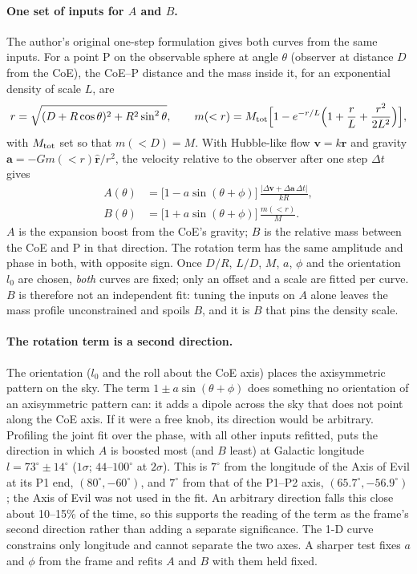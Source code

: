 \documentclass[11pt,a4paper]{article}
\newcommand{\dg}{^\circ}
\begin{document}
\paragraph{One set of inputs for $A$ and $B$.} The author's original one-step formulation gives both curves from the same inputs. For a point P on the observable sphere at angle $\theta$ (observer at distance $D$ from the CoE), the CoE--P distance and the mass inside it, for an exponential density of scale $L$, are
\begin{equation}
r=\sqrt{(D+R\cos\theta)^2+R^2\sin^2\theta},\qquad m(<r)=M_{\rm tot}\Bigl[1-e^{-r/L}\Bigl(1+\frac rL+\frac{r^2}{2L^2}\Bigr)\Bigr],
\end{equation}
with $M_{\rm tot}$ set so that $m(<D)=M$. With Hubble-like flow $\mathbf v=k\mathbf r$ and gravity $\mathbf a=-Gm(<r)\hat{\mathbf r}/r^2$, the velocity relative to the observer after one step $\Delta t$ gives
\begin{align}
A(\theta)&=\bigl[1-a\sin(\theta+\phi)\bigr]\,\frac{\lvert\Delta\mathbf v+\Delta\mathbf a\,\Delta t\rvert}{kR},\label{eq:sheetA}\\
B(\theta)&=\bigl[1+a\sin(\theta+\phi)\bigr]\,\frac{m(<r)}{M}.\label{eq:sheetB}
\end{align}
$A$ is the expansion boost from the CoE's gravity; $B$ is the relative mass between the CoE and P in that direction. The rotation term has the same amplitude and phase in both, with opposite sign. Once $D/R$, $L/D$, $M$, $a$, $\phi$ and the orientation $l_0$ are chosen, \emph{both} curves are fixed; only an offset and a scale are fitted per curve. $B$ is therefore not an independent fit: tuning the inputs on $A$ alone leaves the mass profile unconstrained and spoils $B$, and it is $B$ that pins the density scale.

\paragraph{The rotation term is a second direction.} The orientation ($l_0$ and the roll about the CoE axis) places the axisymmetric pattern on the sky. The term $1\pm a\sin(\theta+\phi)$ does something no orientation of an axisymmetric pattern can: it adds a dipole across the sky that does not point along the CoE axis. If it were a free knob, its direction would be arbitrary. Profiling the joint fit over the phase, with all other inputs refitted, puts the direction in which $A$ is boosted most (and $B$ least) at Galactic longitude $l=73\dg\pm14\dg$ ($1\sigma$; $44$--$100\dg$ at $2\sigma$). This is $7\dg$ from the longitude of the Axis of Evil at its P1 end, $(80\dg,-60\dg)$, and $7\dg$ from that of the P1--P2 axis, $(65.7\dg,-56.9\dg)$; the Axis of Evil was not used in the fit. An arbitrary direction falls this close about 10--15\% of the time, so this supports the reading of the term as the frame's second direction rather than adding a separate significance. The 1-D curve constrains only longitude and cannot separate the two axes. A sharper test fixes $a$ and $\phi$ from the frame and refits $A$ and $B$ with them held fixed.
\end{document}

